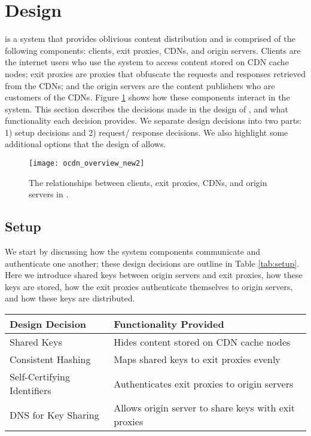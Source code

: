 \section{Design}
\label{sec:design}
\system{} is a system that provides oblivious content distribution and is 
comprised of the following components: clients, exit proxies, CDNs, and origin 
servers.  Clients are the internet users who use the system to access content 
stored on CDN cache nodes; exit proxies are proxies that obfuscate the requests 
and responses retrieved from the CDNs; and the origin servers are the content 
publishers who are customers of the CDNs.  Figure \ref{fig:ocd_overview} shows how
these components interact in the system.  This section describes the decisions 
made in the design of \system{}, and what functionality each decision provides.  
We separate design decisions into two parts: 1) setup decisions and 2) request/
response decisions.  We also highlight some additional options that the design of 
\system{} allows.

\begin{figure}[t!]
\centering
\texttt{[image: ocdn\_overview\_new2]}
\caption{The relationships between clients, exit proxies, CDNs, and origin servers in 
\system{}.}
\label{fig:ocd_overview}
\end{figure}

\subsection{\system{} Setup}
We start by discussing how the system components communicate and authenticate 
one another; these design decisions are outline in Table \ref{tab:setup}.  Here
we introduce shared keys between origin servers and exit proxies, how these keys are 
stored, how the exit proxies authenticate themselves to origin servers, and how these 
keys are distributed.

\begin{table*}[t!]
\centering
\begin{tabular}{| l | l |} 
\hline
 Design Decision & Functionality Provided \\
\hline \hline
 Shared Keys & {Hides content stored on CDN cache nodes} \\
\hline
 Consistent Hashing & {Maps shared keys to exit proxies evenly} \\
\hline
 Self-Certifying Identifiers & {Authenticates exit proxies to origin servers} \\
\hline
 DNS for Key Sharing & {Allows origin server to share keys with exit proxies} \\
\hline
\end{tabular}
\caption{The design decisions associated with the setup and logistical aspects of \system{}, and what these decisions provide.}
\label{tab:setup}
\end{table*}

